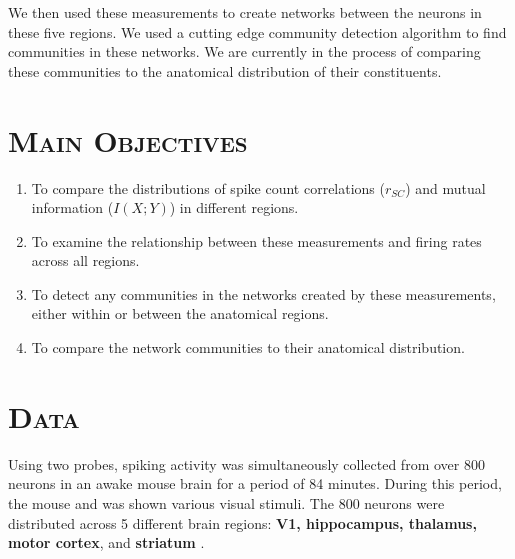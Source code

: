 \documentclass[a0,portrait]{a0poster}
\begin{document}
\begin{multicols}{2}
We then used these measurements to create networks between the neurons in these five regions. We used a cutting edge community detection algorithm to find communities in these networks. We are currently in the process of comparing these communities to the anatomical distribution of their constituents.



\section*{\color{NavyBlue}\textsc{Main Objectives}\color{NavyBlue}}

\begin{enumerate}
  \item To compare the distributions of spike count correlations ($r_{SC}$) and mutual information ($I(X;Y)$) in different regions.
  \item To examine the relationship between these measurements and firing rates across all regions.
  \item To detect any communities in the networks created by these measurements, either within or between the anatomical regions.
  \item To compare the network communities to their anatomical distribution.
\end{enumerate}


\section*{\color{NavyBlue}\textsc{Data}\color{NavyBlue}}

Using two probes, spiking activity was simultaneously collected from over 800 neurons in an awake mouse brain for a period of 84 minutes. During this period, the mouse and was shown various visual stimuli. The 800 neurons were distributed across 5 different brain regions: \textbf{V1, hippocampus, thalamus, motor cortex}, and \textbf{striatum} \cite{jun}.


\end{multicols}
\end{document}
